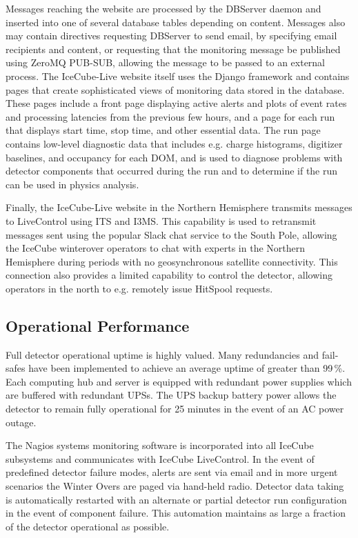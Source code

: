 Messages reaching the website are processed by the DBServer daemon and inserted into one of several database tables depending on content.
Messages also may contain directives requesting DBServer to send email, by specifying email recipients and content,
or requesting that the monitoring message be published using ZeroMQ PUB-SUB, allowing the message to be passed to an external process.  The IceCube-Live
website itself uses the Django framework and contains pages that create sophisticated views of monitoring data stored in the database.
These pages include a front page displaying active alerts and plots of event rates and processing latencies from the previous few hours, and
a page for each run that displays start time, stop time, and other essential data.  The run page contains low-level diagnostic data that
includes e.g. charge histograms, digitizer baselines, and occupancy for each DOM, and is used to diagnose problems with detector components
that occurred during the run and to determine if the run can be used in physics analysis.

Finally, the IceCube-Live website in the Northern Hemisphere transmits messages to LiveControl using ITS and I3MS.  This capability is used to retransmit
messages sent using the popular Slack chat service to the South Pole, allowing the IceCube winterover operators to chat with
experts in the Northern Hemisphere during periods with no geosynchronous satellite connectivity.  This connection also provides a limited
capability to control the detector, allowing operators in the north to e.g. remotely issue HitSpool requests.



\subsection{Operational Performance}

Full detector operational uptime is highly valued. Many redundancies and fail-safes have been implemented to achieve an average uptime of greater than 99\,\%. Each computing hub and server is equipped with redundant power supplies which are buffered with redundant UPSs. The UPS backup battery power allows the detector to remain fully operational for 25 minutes in the event of an AC power outage. 

The Nagios systems monitoring software is incorporated into all IceCube subsystems and communicates with IceCube LiveControl. In the event of predefined detector failure modes, alerts are sent via email and in more urgent scenarios the Winter Overs are paged via hand-held radio. Detector data taking is automatically restarted with an alternate or partial detector run configuration in the event of component failure.  This automation maintains as large a fraction of the detector operational as possible. 

